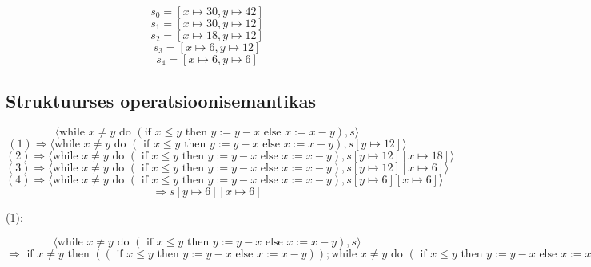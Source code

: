 \documentclass[a4paper,oneside]{article}
\begin{document}
\[s_0 = [x \mapsto 30, y \mapsto 42]\]
\[s_1 = [x \mapsto 30, y \mapsto 12]\]
\[s_2 = [x \mapsto 18, y \mapsto 12]\]
\[s_3 = [x \mapsto 6, y \mapsto 12]\]
\[s_4 = [x \mapsto 6, y \mapsto 6]\]

\subsection{Struktuurses operatsioonisemantikas}

\[
  \langle
  \text{while } x \neq y \text{ do }
  (\text{if } x \leq y
    \text{ then } y := y-x
    \text{ else } x := x-y), s
  \rangle
\]
\[
  (1) \Rightarrow
  \langle
  \text{while } x \neq y \text{ do }
  (\text{ if } x \leq y
    \text{ then } y := y-x
    \text{ else } x := x-y),
    s[y \mapsto 12]
  \rangle
\]
\[
  (2) \Rightarrow
  \langle
  \text{while } x \neq y \text{ do }
  (\text{ if } x \leq y
    \text{ then } y := y-x
    \text{ else } x := x-y),
    s[y \mapsto 12][x \mapsto 18]
  \rangle
\]
\[
  (3) \Rightarrow
  \langle
  \text{while } x \neq y \text{ do }
  (\text{ if } x \leq y
    \text{ then } y := y-x
    \text{ else } x := x-y),
    s[y \mapsto 12][x \mapsto 6]
  \rangle
\]
\[
  (4) \Rightarrow
  \langle
  \text{while } x \neq y \text{ do }
  (\text{ if } x \leq y
    \text{ then } y := y-x
    \text{ else } x := x-y),
    s[y \mapsto 6][x \mapsto 6]
  \rangle
\]
\[
  \Rightarrow
  s[y \mapsto 6][x \mapsto 6]
\]

(1):

\[
\langle
\text{while } x \neq y \text{ do }
(\text{ if } x \leq y
  \text{ then } y := y-x
  \text{ else } x := x-y),
  s
\rangle
\]
\(
  \Rightarrow
  \text{ if } x \neq y
  \text{ then } (
    (\text{ if } x \leq y
      \text{ then } y := y-x
      \text{ else } x := x-y) 
    );
    \text{while } x \neq y \text{ do }
    (\text{ if } x \leq y
      \text{ then } y := y-x
      \text{ else } x := x-y),
  )
  \text{ else skip }  ,s
\)
\end{document}
